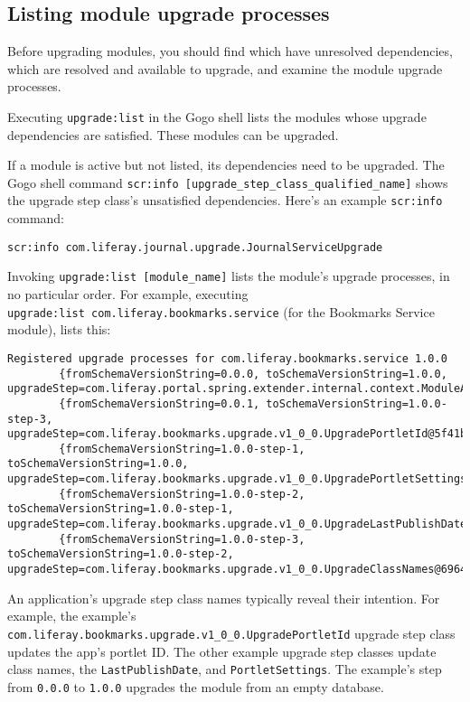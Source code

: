 \subsection{Listing module upgrade
processes}\label{listing-module-upgrade-processes}

Before upgrading modules, you should find which have unresolved
dependencies, which are resolved and available to upgrade, and examine
the module upgrade processes.

Executing \texttt{upgrade:list} in the Gogo shell lists the modules
whose upgrade dependencies are satisfied. These modules can be upgraded.

If a module is active but not listed, its dependencies need to be
upgraded. The Gogo shell command
\texttt{scr:info\ {[}upgrade\_step\_class\_qualified\_name{]}} shows the
upgrade step class's unsatisfied dependencies. Here's an example
\texttt{scr:info} command:

\begin{verbatim}
scr:info com.liferay.journal.upgrade.JournalServiceUpgrade
\end{verbatim}

Invoking \texttt{upgrade:list\ {[}module\_name{]}} lists the module's
upgrade processes, in no particular order. For example, executing
\texttt{upgrade:list\ com.liferay.bookmarks.service} (for the Bookmarks
Service module), lists this:

\begin{verbatim}
Registered upgrade processes for com.liferay.bookmarks.service 1.0.0
        {fromSchemaVersionString=0.0.0, toSchemaVersionString=1.0.0, upgradeStep=com.liferay.portal.spring.extender.internal.context.ModuleApplicationContextExtender$ModuleApplicationContextExtension$1@6e9691da}
        {fromSchemaVersionString=0.0.1, toSchemaVersionString=1.0.0-step-3, upgradeStep=com.liferay.bookmarks.upgrade.v1_0_0.UpgradePortletId@5f41b7ee}
        {fromSchemaVersionString=1.0.0-step-1, toSchemaVersionString=1.0.0, upgradeStep=com.liferay.bookmarks.upgrade.v1_0_0.UpgradePortletSettings@53929b1d}
        {fromSchemaVersionString=1.0.0-step-2, toSchemaVersionString=1.0.0-step-1, upgradeStep=com.liferay.bookmarks.upgrade.v1_0_0.UpgradeLastPublishDate@3e05b7c8}
        {fromSchemaVersionString=1.0.0-step-3, toSchemaVersionString=1.0.0-step-2, upgradeStep=com.liferay.bookmarks.upgrade.v1_0_0.UpgradeClassNames@6964cb47}
\end{verbatim}

An application's upgrade step class names typically reveal their
intention. For example, the example's
\texttt{com.liferay.bookmarks.upgrade.v1\_0\_0.UpgradePortletId} upgrade
step class updates the app's portlet ID. The other example upgrade step
classes update class names, the \texttt{LastPublishDate}, and
\texttt{PortletSettings}. The example's step from \texttt{0.0.0} to
\texttt{1.0.0} upgrades the module from an empty database.

